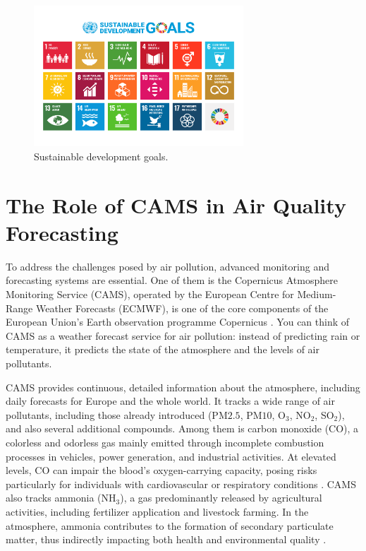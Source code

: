 \begin{figure}[h!btp]
	\centering
	\includegraphics[width=0.7\textwidth]{fig/sustainable-image.png}
	\caption[Sustainable development goals]{Sustainable development goals.\footnotemark}
	\label{fig:ej1}
\end{figure}


\section{The Role of CAMS in Air Quality Forecasting}

To address the challenges posed by air pollution, advanced monitoring and forecasting systems are essential. One of them is the Copernicus Atmosphere Monitoring Service (CAMS), operated by the European Centre for Medium-Range Weather Forecasts (ECMWF), is one of the core components of the European Union's Earth observation programme Copernicus \cite{copernicusCopernicus,ecmwfECMWF}. You can think of CAMS as a weather forecast service for air pollution: instead of predicting rain or temperature, it predicts the state of the atmosphere and the levels of air pollutants. 

CAMS provides continuous, detailed information about the atmosphere, including daily forecasts for Europe and the whole world. It tracks a wide range of air pollutants, including those already introduced (PM${2.5}$, PM${10}$, O$_3$, NO$_2$, SO$_2$), and also several additional compounds.
Among them is carbon monoxide (CO), a colorless and odorless gas mainly emitted through incomplete combustion processes in vehicles, power generation, and industrial activities. At elevated levels, CO can impair the blood’s oxygen-carrying capacity, posing risks particularly for individuals with cardiovascular or respiratory conditions \cite{raub2000carbon}. CAMS also tracks ammonia (NH$_3$), a gas predominantly released by agricultural activities, including fertilizer application and livestock farming. In the atmosphere, ammonia contributes to the formation of secondary particulate matter, thus indirectly impacting both health and environmental quality \cite{wyer2022ammonia}.


